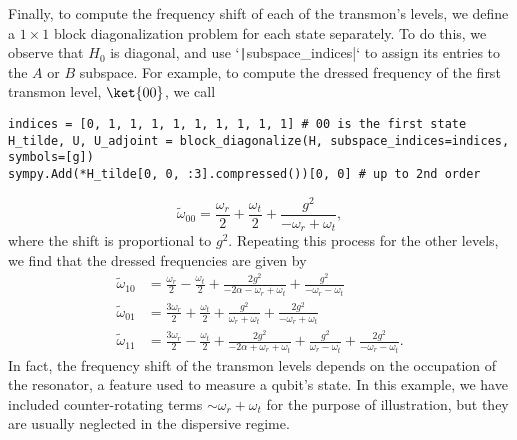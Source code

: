 Finally, to compute the frequency shift of each of the transmon's levels, we
define a $1 \times 1$ block diagonalization problem for each state separately.
To do this, we observe that $H_0$ is diagonal, and use
`\texttt|subspace_indices|` to assign its entries to the $A$ or $B$
subspace.
For example, to compute the dressed frequency of the first transmon level,
$\ket{00}$, we call
%
\begin{verbatim}
indices = [0, 1, 1, 1, 1, 1, 1, 1, 1, 1] # 00 is the first state
H_tilde, U, U_adjoint = block_diagonalize(H, subspace_indices=indices, symbols=[g])
sympy.Add(*H_tilde[0, 0, :3].compressed())[0, 0] # up to 2nd order
\end{verbatim}
%
\begin{equation}
    \label{eq:dressed_energy_00}
    \tilde{\omega}_{00} = \frac{\omega_{r}}{2} + \frac{\omega_{t}}{2} + \frac{g^{2}}{- \omega_{r} + \omega_{t}},
\end{equation}
%
where the shift is proportional to $g^2$.
Repeating this process for the other levels, we find that the dressed
frequencies are given by
%
\begin{align}
    \label{eq:dressed_energy}
    \tilde{\omega}_{10} &= \frac{\omega_{r}}{2} - \frac{\omega_{t}}{2} + \frac{2 g^{2}}{- 2 \alpha - \omega_{r} + \omega_{t}} + \frac{g^{2}}{- \omega_{r} - \omega_{t}} \\
    \tilde{\omega}_{01} &= \frac{3 \omega_{r}}{2} + \frac{\omega_{t}}{2} + \frac{g^{2}}{\omega_{r} + \omega_{t}} + \frac{2 g^{2}}{- \omega_{r} + \omega_{t}} \\
    \tilde{\omega}_{11} &= \frac{3 \omega_{r}}{2} - \frac{\omega_{t}}{2} + \frac{2 g^{2}}{- 2 \alpha + \omega_{r} + \omega_{t}} + \frac{g^{2}}{\omega_{r} - \omega_{t}} + \frac{2 g^{2}}{- \omega_{r} - \omega_{t}}.
\end{align}
In fact, the frequency shift of the transmon levels depends on the occupation
of the resonator, a feature used to measure a qubit's state.
In this example, we have included counter-rotating terms $\sim \omega_{r} +
\omega_{t}$ for the purpose of illustration, but they are usually neglected in
the dispersive regime.
